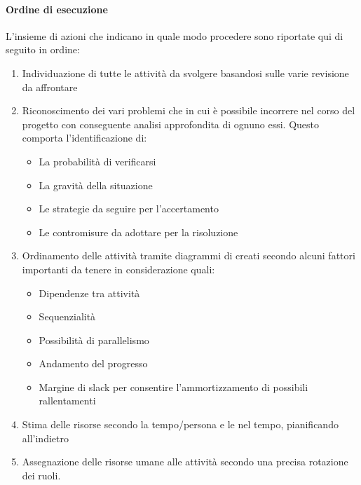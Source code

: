 			\paragraph{Ordine di esecuzione}
			L'insieme di azioni che indicano in quale modo procedere sono riportate qui di seguito in ordine:
			\begin{enumerate}
				\item Individuazione di tutte le attività da svolgere basandosi sulle varie revisione da affrontare
				\item Riconoscimento dei vari problemi che in cui è possibile incorrere nel corso del progetto con conseguente analisi approfondita di ognuno essi. Questo comporta l'identificazione di:
				\begin{itemize}
					\item La probabilità di verificarsi
					\item La gravità della situazione
					\item Le strategie da seguire per l'accertamento
					\item Le contromisure da adottare per la risoluzione
				\end{itemize}
				\item Ordinamento delle attività tramite diagrammi di  creati secondo alcuni fattori importanti da tenere in considerazione quali:
				\begin{itemize}
					\item Dipendenze tra attività
					\item Sequenzialità
					\item Possibilità di parallelismo
					\item Andamento del progresso
					\item Margine di slack per consentire l'ammortizzamento di possibili rallentamenti
				\end{itemize}
			\item Stima delle risorse secondo la  tempo/persona e le  nel tempo, pianificando all'indietro
			\item Assegnazione delle risorse umane alle attività secondo una precisa rotazione dei ruoli.
			\end{enumerate}
		
